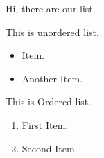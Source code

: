 \documentclass[a4paper]{article}
\begin{document}
Hi, there are our list.

This is unordered list.
 \begin{itemize}
  \item Item.
  \item Another Item.
 \end{itemize}

This is Ordered list.
 \begin{enumerate}
  \item First Item.
  \item Second Item.
 \end{enumerate}
\end{document}
